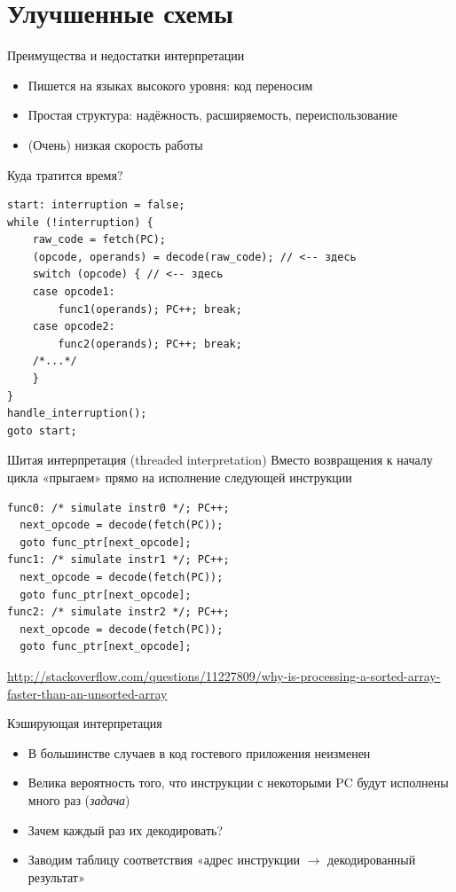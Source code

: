 \documentclass{beamer}
\begin{document}
\section{Улучшенные схемы}

\begin{frame}{Преимущества и недостатки интерпретации}
\begin{itemize}
\item Пишется на языках высокого уровня: код переносим
\item Простая структура: надёжность, расширяемость, переиспользование
\end{itemize}
\pause
\begin{itemize}
\item (Очень) низкая скорость работы
\end{itemize}
\end{frame}

\begin{frame}[fragile]{Куда тратится время?}
\begin{verbatim}
start: interruption = false;
while (!interruption) {
    raw_code = fetch(PC);
    (opcode, operands) = decode(raw_code); // <-- здесь
    switch (opcode) { // <-- здесь
    case opcode1:
        func1(operands); PC++; break;
    case opcode2:
        func2(operands); PC++; break;
    /*...*/
    }
}
handle_interruption();
goto start;
\end{verbatim}
\end{frame}

\begin{frame}[fragile]{Шитая интерпретация (threaded interpretation)}
Вместо возвращения к началу цикла «прыгаем» прямо на исполнение следующей инструкции
\begin{verbatim}
func0: /* simulate instr0 */; PC++;
  next_opcode = decode(fetch(PC));
  goto func_ptr[next_opcode];
func1: /* simulate instr1 */; PC++;
  next_opcode = decode(fetch(PC));
  goto func_ptr[next_opcode];
func2: /* simulate instr2 */; PC++;
  next_opcode = decode(fetch(PC));
  goto func_ptr[next_opcode];
\end{verbatim}

\tiny\url{http://stackoverflow.com/questions/11227809/why-is-processing-a-sorted-array-faster-than-an-unsorted-array}
\end{frame}

\begin{frame}{Кэширующая интерпретация}
\begin{itemize}
\item В большинстве случаев в код гостевого приложения неизменен
\item Велика вероятность того, что инструкции с некоторыми PC будут исполнены много раз (\textit{задача})
\item Зачем каждый раз их декодировать?
\item Заводим таблицу соответствия «адрес инструкции $\rightarrow$ декодированный результат» 
\end{itemize}

\end{frame}
\end{document}
